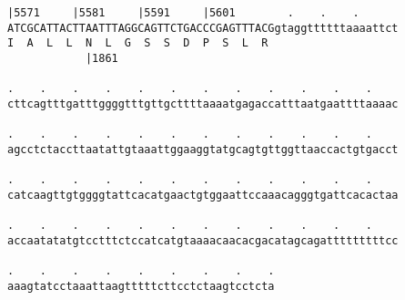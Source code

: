\documentclass{article}
\begin{document}
\begin{Verbatim}[fontfamily=courier]
  |5571     |5581     |5591     |5601        .    .    .    
ATCGCATTACTTAATTTAGGCAGTTCTGACCCGAGTTTACGgtaggttttttaaaattct
I  A  L  L  N  L  G  S  S  D  P  S  L  R                    
            |1861                                           

.    .    .    .    .    .    .    .    .    .    .    .    
cttcagtttgatttggggtttgttgcttttaaaatgagaccatttaatgaattttaaaac

.    .    .    .    .    .    .    .    .    .    .    .    
agcctctaccttaatattgtaaattggaaggtatgcagtgttggttaaccactgtgacct

.    .    .    .    .    .    .    .    .    .    .    .    
catcaagttgtggggtattcacatgaactgtggaattccaaacagggtgattcacactaa

.    .    .    .    .    .    .    .    .    .    .    .    
accaatatatgtcctttctccatcatgtaaaacaacacgacatagcagatttttttttcc

.    .    .    .    .    .    .    .    .
aaagtatcctaaattaagtttttcttcctctaagtcctcta
\end{Verbatim}
\newpage
\end{document}
